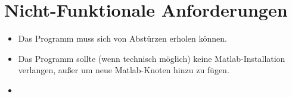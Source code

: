 \section{Nicht-Funktionale Anforderungen}

\begin{itemize}
\item Das Programm muss sich von Abstürzen erholen können.
\item Das Programm sollte (wenn technisch möglich) keine Matlab-Installation verlangen, außer um neue Matlab-Knoten hinzu zu fügen.
\item 
\end{itemize}